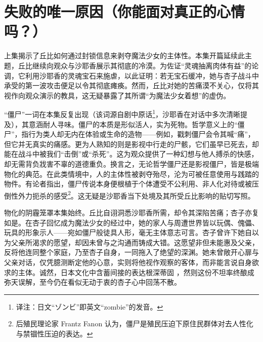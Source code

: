 \chapter[失败的唯一原因（你能面对真正的心情吗？）]{失败的唯一原因\protect\footnotemark（你能面对真正的心情吗？）}

上集揭示了丘比如何通过封锁信息来剥夺魔法少女的主体性。本集开篇延续此主题，丘比继续向观众与沙耶香展示其彻底的冷漠。为佐证“灵魂抽离肉体有益”的论调，它利用沙耶香的灵魂宝石来施虐，以此证明：若无宝石缓冲，她与杏子战斗中承受的第一波攻击便足以令其彻底瘫痪。然而，丘比对她的苦痛漠不关心，仅将其视作向观众演示的教具，这无疑暴露了其所谓“为魔法少女着想”的虚伪。

“僵尸”一词在本集反复出现（该词源自剧中原话\footnote{译注：日文“ゾンビ”即英文“zombie”的发音。}，沙耶香在对话中多次清晰提及），其意涵耐人寻味。僵尸的本质是形似活人，实为死物。哲学意义上的“僵尸”，指行为类人却无内在体验或生命的造物——例如，戳刺僵尸会令其喊“痛”，但它并无真实的痛感\cite{ref39}。更为人熟知的则是影视中行走的尸骸，它们虽早已死去，却能在战斗中被我们“击倒”或“杀死”。这为观众提供了一种幻想与他人搏杀的快感，却无需背负戕害不辜的道德重负\cite{ref40}。换言之，无论哲学僵尸还是影视僵尸，皆是极端物化的典范。在此类情境中，人的主体性被剥夺殆尽，沦为可被任意使用与践踏的物件。有论者指出，僵尸传说本身便根植于个体遭受不公利用、非人化对待或被压倒性外力扼杀的感受\footnote{后殖民理论家 Frantz Fanon 认为，僵尸是殖民压迫下原住民群体对去人性化与禁锢性压迫的表达。}\cite{ref41}。这无疑是沙耶香当下处境及其所受丘比影响的贴切写照。

物化的阴霾笼罩本集始终。丘比自诩洞悉沙耶香所需，却令其深陷苦痛；杏子亦复如是。在杏子回忆成为魔法少女的经过中，她的家人与周遭世界皆以玩偶、傀儡、玩具的形象示人——宛如僵尸般徒具人形，毫无主体意志可言。杏子曾许下她自以为父亲所渴求的愿望，却因未曾与之沟通而铸成大错。这愿望非但未能惠及父亲，反将他连同整个家庭，乃至杏子自身，一同拖入了绝望的深渊。她未曾敞开心扉与父亲对话，仅凭臆测断定他的心意，实则将他视作观察的客体，而非能言说自身欲求的主体。诚然，日本文化中含蓄间接的表达根深蒂固 \cite{ref42}，然则这份不坦率终酿成弥天误解，至今仍在看似无动于衷的杏子心中回荡不散。

